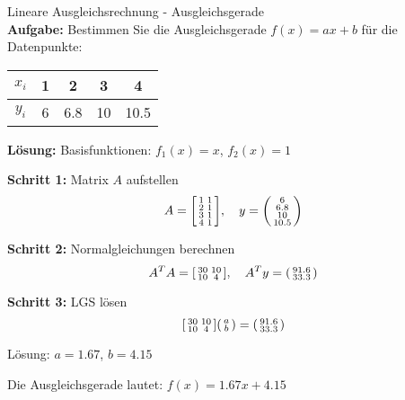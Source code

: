 \begin{example2}{Lineare Ausgleichsrechnung - Ausgleichsgerade}\\
\textbf{Aufgabe:} Bestimmen Sie die Ausgleichsgerade $f(x) = ax + b$ für die Datenpunkte:
\begin{center}
\begin{tabular}{|c|c|c|c|c|}
\hline
$x_i$ & 1 & 2 & 3 & 4 \\
\hline
$y_i$ & 6 & 6.8 & 10 & 10.5 \\
\hline
\end{tabular}
\end{center}
\tcblower
\textbf{Lösung:}
Basisfunktionen: $f_1(x) = x$, $f_2(x) = 1$

\textbf{Schritt 1:} Matrix $A$ aufstellen
$$A = \begin{bsmallmatrix} 1 & 1 \\ 2 & 1 \\ 3 & 1 \\ 4 & 1 \end{bsmallmatrix}, \quad y = \begin{psmallmatrix} 6 \\ 6.8 \\ 10 \\ 10.5 \end{psmallmatrix}$$

\textbf{Schritt 2:} Normalgleichungen berechnen
$$A^T A = \begin{bsmallmatrix} 30 & 10 \\ 10 & 4 \end{bsmallmatrix}, \quad A^T y = \begin{psmallmatrix} 91.6 \\ 33.3 \end{psmallmatrix}$$

\textbf{Schritt 3:} LGS lösen
$$\begin{bsmallmatrix} 30 & 10 \\ 10 & 4 \end{bsmallmatrix} \begin{psmallmatrix} a \\ b \end{psmallmatrix} = \begin{psmallmatrix} 91.6 \\ 33.3 \end{psmallmatrix}$$

Lösung: $a = 1.67$, $b = 4.15$

Die Ausgleichsgerade lautet: $f(x) = 1.67x + 4.15$
\end{example2}

